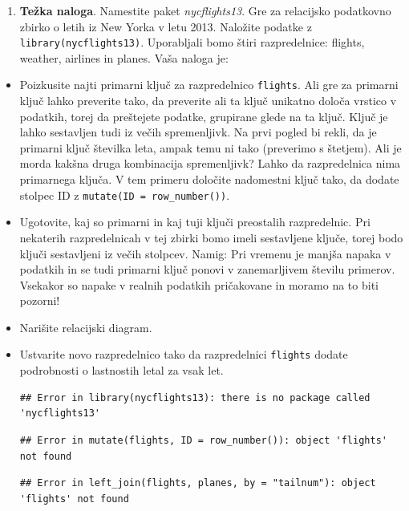 \documentclass[
]{book}
\providecommand{\tightlist}{%
  \setlength{\itemsep}{0pt}\setlength{\parskip}{0pt}}
\begin{document}
\begin{enumerate}
\def\labelenumi{\arabic{enumi})}
\setcounter{enumi}{3}
\tightlist
\item
  \textbf{Težka naloga}. Namestite paket \emph{nycflights13}. Gre za relacijsko podatkovno zbirko o letih iz New Yorka v letu 2013. Naložite podatke z \texttt{library(nycflights13)}. Uporabljali bomo štiri razpredelnice: flights, weather, airlines in planes. Vaša naloga je:
\end{enumerate}

\begin{itemize}
\item
  Poizkusite najti primarni ključ za razpredelnico \texttt{flights}. Ali gre za primarni ključ lahko preverite tako, da preverite ali ta ključ unikatno določa vrstico v podatkih, torej da preštejete podatke, grupirane glede na ta ključ. Ključ je lahko sestavljen tudi iz večih spremenljivk. Na prvi pogled bi rekli, da je primarni ključ številka leta, ampak temu ni tako (preverimo s štetjem). Ali je morda kakšna druga kombinacija spremenljivk? Lahko da razpredelnica nima primarnega ključa. V tem primeru določite nadomestni ključ tako, da dodate stolpec ID z \texttt{mutate(ID\ =\ row\_number())}.
\item
  Ugotovite, kaj so primarni in kaj tuji ključi preostalih razpredelnic. Pri nekaterih razpredelnicah v tej zbirki bomo imeli sestavljene ključe, torej bodo ključi sestavljeni iz večih stolpcev. Namig: Pri vremenu je manjša napaka v podatkih in se tudi primarni ključ ponovi v zanemarljivem številu primerov. Vsekakor so napake v realnih podatkih pričakovane in moramo na to biti pozorni!
\item
  Narišite relacijski diagram.
\item
  Ustvarite novo razpredelnico tako da razpredelnici \texttt{flights} dodate podrobnosti o lastnostih letal za vsak let.

\begin{verbatim}
## Error in library(nycflights13): there is no package called 'nycflights13'
\end{verbatim}

\begin{verbatim}
## Error in mutate(flights, ID = row_number()): object 'flights' not found
\end{verbatim}

\begin{verbatim}
## Error in left_join(flights, planes, by = "tailnum"): object 'flights' not found
\end{verbatim}


\end{itemize}
\end{document}
